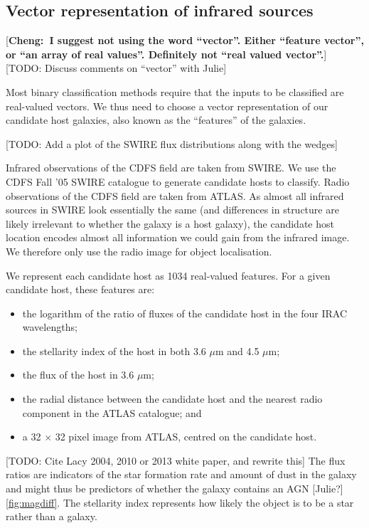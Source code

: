 \documentclass[fleqn,usenatbib,usedcolumn]{mnras}
\newcommand{\cheng}[1]{ {\color{teal}[{\bf Cheng:~{#1}}]} }
\begin{document}
  \subsection{Vector representation of infrared
  sources}\label{vector-representation-of-infrared-sources}

  \cheng{I suggest not using the word ``vector''. Either ``feature vector'',
  or ``an array of real values''. Definitely not ``real valued vector''.}
    {[}TODO: Discuss comments on ``vector'' with Julie{]}

    Most binary classification methods require that the inputs to be
    classified are real-valued vectors. We thus need to choose a vector
    representation of our candidate host galaxies, also known as the
    ``features'' of the galaxies.

    {[}TODO: Add a plot of the SWIRE flux distributions along with the
    wedges{]}

    Infrared observations of the CDFS field are taken from SWIRE. We use the
    CDFS Fall '05 SWIRE catalogue \citep{surace05swire} to generate candidate
    hosts to classify. Radio observations of the CDFS field are taken from
    ATLAS. As almost all infrared sources in SWIRE look essentially the same
    (and differences in structure are likely irrelevant to whether the galaxy
    is a host galaxy), the candidate host location encodes almost all
    information we could gain from the infrared image. We therefore only use
    the radio image for object localisation.

    We represent each candidate host as 1034 real-valued features. For a given
    candidate host, these features are:
    \begin{itemize}
      \item the logarithm of the ratio of fluxes of the candidate host in the
        four IRAC wavelengths;
      \item the stellarity index of the host in both 3.6 $\mu$m and 4.5
        $\mu$m;
      \item the flux of the host in 3.6 $\mu$m;
      \item the radial distance between the candidate host and the nearest
        radio component in the ATLAS catalogue; and
      \item a 32 $\times$ 32 pixel image from ATLAS, centred on the candidate
        host.
    \end{itemize}

    [TODO: Cite Lacy 2004, 2010 or 2013 white paper, and rewrite this] The
    flux ratios are indicators of the star formation rate and amount of dust
    in the galaxy and might thus be predictors of whether the galaxy contains
    an AGN {[}Julie?{]} \ref{fig:magdiff}. The stellarity index represents how
    likely the object is to be a star rather than a galaxy.
\end{document}
